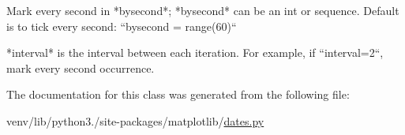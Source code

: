 \begin{DoxyVerb}Mark every second in *bysecond*; *bysecond* can be an int or
sequence.  Default is to tick every second: ``bysecond = range(60)``

*interval* is the interval between each iteration.  For
example, if ``interval=2``, mark every second occurrence.\end{DoxyVerb}
 

The documentation for this class was generated from the following file\+:\begin{DoxyCompactItemize}
\item 
venv/lib/python3./site-\/packages/matplotlib/\hyperlink{dates_8py}{dates.\+py}\end{DoxyCompactItemize}
